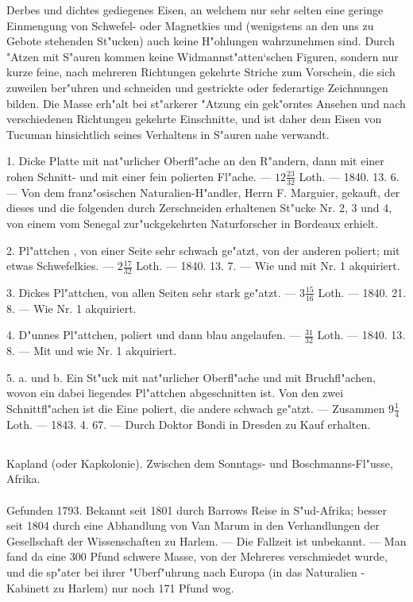 \documentclass[a4paper, 11pt, oneside, polutonikogreek, german]{article}
\begin{document}
Derbes und dichtes gediegenes Eisen, an welchem nur sehr selten eine geringe Einmengung von Schwefel- oder Magnetkies und (wenigstens an den uns zu Gebote stehenden St"ucken) auch keine H"ohlungen wahrzunehmen sind. Durch "Atzen mit S"auren kommen keine Widmannst"atten‘schen Figuren, sondern nur kurze feine, nach mehreren Richtungen gekehrte Striche zum Vorschein, die sich zuweilen ber"uhren und schneiden und gestrickte oder federartige Zeichnungen bilden. Die Masse erh"alt bei st"arkerer "Atzung ein gek"orntes Ansehen und nach verschiedenen Richtungen gekehrte Einschnitte, und ist daher dem Eisen von Tucuman hinsichtlich seines Verhaltens in S"auren nahe verwandt.

1. Dicke Platte mit nat"urlicher Oberfl"ache an den R"andern, dann mit einer rohen Schnitt- und mit einer fein polierten Fl"ache. --- $\mathfrak{12\frac{23}{32}}$ Loth. --- 1840. 13. 6. --- Von dem franz"osischen Naturalien-H"andler, Herrn F. Marguier, gekauft, der dieses und die folgenden durch Zerschneiden erhaltenen St"ucke Nr. 2, 3 und 4, von einem vom Senegal zur"uckgekehrten Naturforscher in Bordeaux erhielt.

2. Pl"attchen , von einer Seite sehr schwach ge"atzt, von der anderen poliert; mit etwas Schwefelkies. --- $\mathfrak{2\frac{17}{32}}$ Loth. --- 1840. 13. 7. --- Wie und mit Nr. 1 akquiriert.

3. Dickes Pl"attchen, von allen Seiten sehr stark ge"atzt. --- $\mathfrak{3\frac{15}{16}}$ Loth. --- 1840. 21. 8. --- Wie Nr. 1 akquiriert.

4. D"unnes Pl"attchen, poliert und dann blau angelaufen. --- $\mathfrak{\frac{31}{32}}$ Loth. --- 1840. 13. 8. --- Mit und wie Nr. 1 akquiriert.

5. a. und b. Ein St"uck mit nat"urlicher Oberfl"ache und mit Bruchfl"achen, wovon ein dabei liegendes Pl"attchen abgeschnitten ist. Von den zwei Schnittfl"achen ist die Eine poliert, die andere schwach ge"atzt. --- Zusammen $\mathfrak{9\frac{1}{4}}$ Loth. --- 1843. 4. 67. --- Durch Doktor Bondi in Dresden zu Kauf erhalten.
\subsection{}
\begin{center}

Kapland (oder Kapkolonie). Zwischen dem Sonntags- und Boschmanns-Fl"usse, Afrika.
\end{center}
\paragraph{}
Gefunden 1793. Bekannt seit 1801 durch Barrows Reise in S"ud-Afrika; besser seit 1804 durch eine Abhandlung von Van Marum in den Verhandlungen der Gesellschaft der Wissenschaften zu Harlem. --- Die Fallzeit ist unbekannt. --- Man fand da eine 300 Pfund schwere Masse, von der Mehreres verschmiedet wurde, und die sp"ater bei ihrer "Uberf"uhrung nach Europa (in das Naturalien -Kabinett zu Harlem) nur noch 171 Pfund wog.
\end{document}
